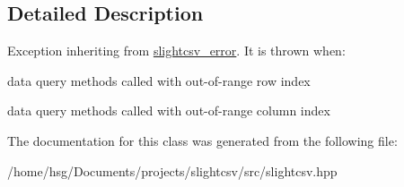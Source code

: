 \subsection{Detailed Description}
Exception inheriting from \hyperlink{classutils_1_1slightcsv__error}{slightcsv\+\_\+error}. It is thrown when\+:
\begin{DoxyItemize}
\item data query methods called with out-\/of-\/range row index
\item data query methods called with out-\/of-\/range column index 
\end{DoxyItemize}

The documentation for this class was generated from the following file\+:\begin{DoxyCompactItemize}
\item 
/home/hsg/\+Documents/projects/slightcsv/src/slightcsv.\+hpp\end{DoxyCompactItemize}
